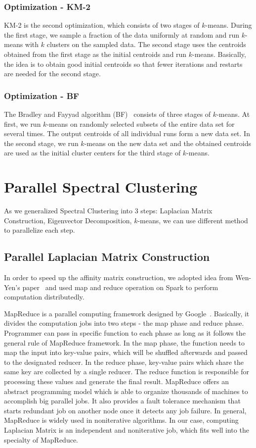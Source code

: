 \documentclass{acm_proc_article-sp}
\begin{document}
\subsubsection{Optimization - KM-2}
KM-2 is the second optimization, which consists of two stages of $k$-means. During the first stage, we sample a fraction of the data uniformly at random and run $k$-means with $k$ clusters on the sampled data. The second stage uses the centroids obtained from the first stage as the initial centroids and run $k$-means. Basically, the idea is to obtain good initial centroids so that fewer iterations and restarts are needed for the second stage.
\subsubsection{Optimization - BF}
The Bradley and Fayyad algorithm (BF)~\cite{bradley1998refining} consists of three stages of $k$-means. At first, we run $k$-means on randomly selected subsets of the entire data set for several times. The output centroids of all individual runs form a new data set. In the second stage, we run $k$-means on the new data set and the obtained centroids are used as the initial cluster centers for the third stage of $k$-means.


\section{Parallel Spectral Clustering}
As we generalized Spectral Clustering into 3 steps: Laplacian Matrix Construction, Eigenvector Decomposition, $k$-means, we can use different method to parallelize each step.

\subsection{Parallel Laplacian Matrix Construction}
In order to speed up the affinity matrix construction, we adopted idea from Wen-Yen's paper~\cite{chen2011parallel} and used map and reduce operation on Spark to perform computation distributedly.

MapReduce is a parallel computing framework designed by Google~\cite{dean2008mapreduce}. Basically, it divides the computation jobs into two steps - the map phase and reduce phase. Programmer can pass in specific function to each phase as long as it follows the general rule of MapReduce framework. In the map phase, the function needs to map the input into key-value pairs, which will be shuffled afterwards and passed to the designated reducer. In the reduce phase, key-value pairs which share the same key are collected by a single reducer. The reduce function is responsible for processing these values and generate the final result. MapReduce offers an abstract programming model which is able to organize thousands of machines to accomplish big parallel jobs. It also provides a fault tolerance mechanism that starts redundant job on another node once it detects any job failure. In general, MapReduce is widely used in noniterative algorithms. In our case, computing Laplacian Matrix is an independent and noniterative job, which fits well into the specialty of MapReduce.
\end{document}
